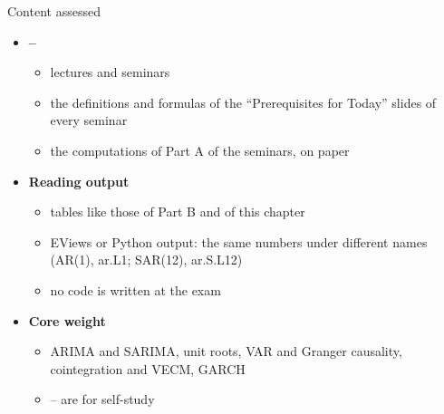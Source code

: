 \begin{frame}{Content assessed}
\itemsize{\small}
\begin{itemize}
    \item \textbf{--}
    \begin{itemize}
        \item lectures and seminars
        \item the definitions and formulas of the ``Prerequisites for Today'' slides of every seminar
        \item the computations of Part A of the seminars, on paper
    \end{itemize}
    \item \textbf{Reading output}
    \begin{itemize}
        \item tables like those of Part B and of this chapter
        \item EViews or Python output: the same numbers under different names (AR(1), ar.L1; SAR(12), ar.S.L12)
        \item no code is written at the exam
    \end{itemize}
    \item \textbf{Core weight}
    \begin{itemize}
        \item ARIMA and SARIMA, unit roots, VAR and Granger causality, cointegration and VECM, GARCH
        \item {}-- are for self-study
    \end{itemize}
\end{itemize}
\end{frame}

